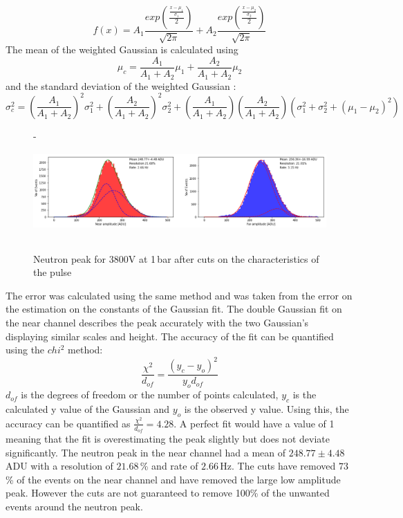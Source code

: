 \documentclass[a4paper]{article}
\begin{document}
\begin{equation}
     f(x) = A_1\frac{exp(\frac{\frac{x-\mu_1}{\sigma_1}}{2})}{\sqrt{2\pi}} + A_2\frac{exp(\frac{\frac{x-\mu_2}{\sigma_2}}{2})}{\sqrt{2\pi}}
\end{equation}
The mean of the weighted Gaussian is calculated using 
\begin{equation}
    \mu_c = \frac{A_1}{A_1+A_2}\mu_1 + \frac{A_2}{A_1+A_2}\mu_2  
\end{equation}
and the standard deviation of the weighted Gaussian \cite{tzamarias}:
\begin{equation}
    \sigma_c^2 = \left(\frac{A_1}{A_1+A_2}\right)^2\sigma_1^2 + \left(\frac{A_2}{A_1+A_2}\right)^2\sigma_2^2 + \left(\frac{A_1}{A_1+A_2}\right)\left(\frac{A_2}{A_1+A_2}\right)(\sigma_1^2+\sigma_2^2+(\mu_1 - \mu_2)^2)
\end{equation}
\begin{figure}[H]- 
    \centering
    \includegraphics[height=3.7cm]{uk24n001_amp.png}
    \caption{Neutron peak for 3800V at 1\,bar after cuts on the characteristics of the pulse}
    \label{fig:1aft}
\end{figure}
\noindent The error was calculated using the same method and was taken from the error on the estimation on the constants of the Gaussian fit. The double Gaussian fit on the near channel describes the peak accurately with the two Gaussian's displaying similar scales and height. The accuracy of the fit can be quantified using the $chi^2$ method:
\begin{equation}
   \frac{\chi^2}{d_{of}} =  \frac{(y_c-y_o)^2}{y_od_{of}}
   \label{eq:chi}
\end{equation}
$d_{of}$ is the degrees of freedom or the number of points calculated, $y_c$ is the calculated y value of the Gaussian and $y_o$ is the observed y value.
\newline Using this, the accuracy can be quantified as $\frac{\chi^2}{d_{of}} = 4.28$. A perfect fit would have a value of 1 meaning that the fit is overestimating the peak slightly but does not deviate significantly. The neutron peak in the near channel had a mean of $248.77 \pm 4.48$\,ADU with a resolution of $21.68$\,\% and rate of $2.66$\,Hz. The cuts have removed $73$\,\% of the events on the near channel and have removed the large low amplitude peak. However the cuts are not guaranteed to remove 100\% of the unwanted events around the neutron peak.
\end{document}
